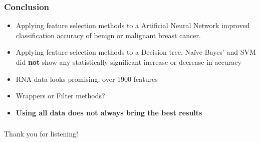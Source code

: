 \documentclass[aspectratio=1610]{beamer}
\begin{document}
\begin{frame}
  \frametitle{\hfill Conclusion}
  \begin{itemize}
  \item Applying feature selection methods to a Artificial Neural Network improved classification accuracy of benign or malignant breast cancer. \\ \pause

  \item Applying feature selection methods to a Decision tree, Na\"ive Bayes' and SVM did \textbf{not} show any statistically significant increase or decrease in accuracy \\ \pause

  \item RNA data looks promising, over 1900 features \\ \pause

  \item Wrappers or Filter methods? \\ \pause

  \item \textbf{Using all data does not always bring the best results}

  \end{itemize}
\end{frame}

\begin{frame}
  \frametitle{\hfill }
  Thank you for listening!
\end{frame}
\end{document}
